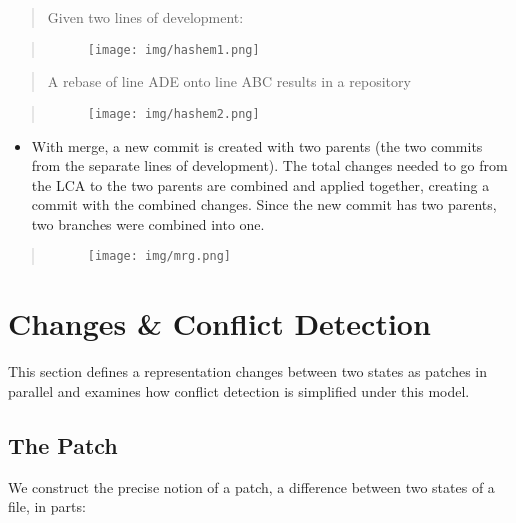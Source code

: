 \documentclass[]{article}
\makeatletter
\def\maxwidth{\ifdim\Gin@nat@width>\linewidth\linewidth
\else\Gin@nat@width\fi}
\let\Oldincludegraphics\includegraphics
\renewcommand{\includegraphics}[1]{\Oldincludegraphics[width=\maxwidth]{#1}}
\makeatother
\begin{document}
\begin{quote}
Given two lines of development:
\end{quote}

\begin{quote}
\begin{figure}[Figure 1]
\centering
\texttt{[image: img/hashem1.png]}
\caption{}
\end{figure}
\end{quote}

\begin{quote}
A rebase of line ADE onto line ABC results in a repository
\end{quote}

\begin{quote}
\begin{figure}[Figure 2]
\centering
\texttt{[image: img/hashem2.png]}
\caption{}
\end{figure}
\end{quote}

\begin{itemize}
\item
  With merge, a new commit is created with two parents (the two commits
  from the separate lines of development). The total changes needed to
  go from the LCA to the two parents are combined and applied together,
  creating a commit with the combined changes. Since the new commit has
  two parents, two branches were combined into one.
\end{itemize}

\begin{quote}
\begin{figure}[Figure 3]
\centering
\texttt{[image: img/mrg.png]}
\caption{}
\end{figure}
\end{quote}

\section{Changes \& Conflict Detection}

This section defines a representation changes between two states as
patches in parallel and examines how conflict detection is simplified
under this model.

\subsection{The Patch}

We construct the precise notion of a patch, a difference between two
states of a file, in parts:
\end{document}
